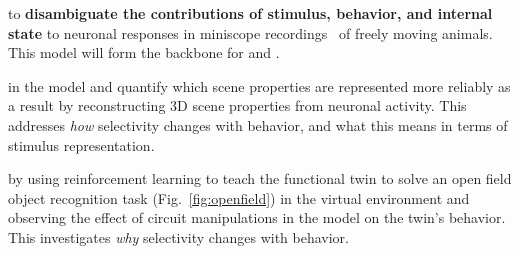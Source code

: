 \documentclass[COG,11pt]{ercgrant}
\begin{document}
 \textbf{\oonetitle} to \textbf{disambiguate the contributions of stimulus, behavior, and internal state} to neuronal responses in miniscope recordings~\parencite[see Fig.~\ref{fig:miniscope}]{Cai2016-rh} of freely moving animals. This model will form the backbone for  and .

 \textbf{\otwotitle} in the model and quantify which scene properties are represented more reliably as a result by reconstructing 3D scene properties from neuronal activity. This addresses \textit{how} selectivity changes with behavior, and what this means in terms of stimulus representation. 

 \textbf{\othreetitle} by using reinforcement learning to teach the functional twin to solve an open field object recognition task (Fig.~\ref{fig:openfield}) in the virtual environment and observing the effect of circuit manipulations in the model on the twin's behavior. 
This investigates \textit{why} selectivity changes with behavior.

    
    
\end{document}
